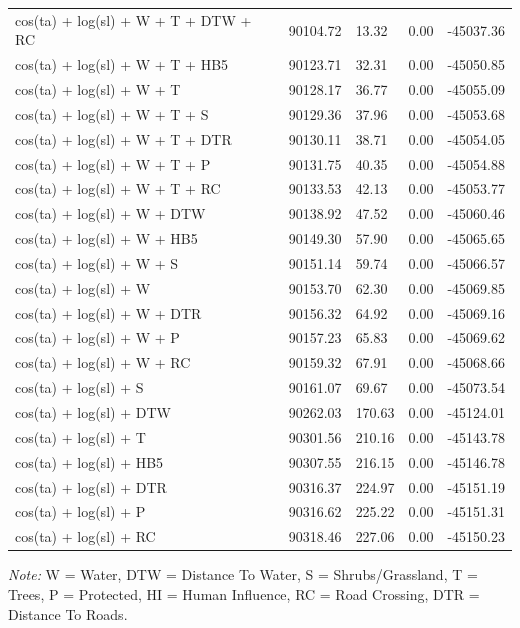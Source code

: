 \documentclass[abstract=off,10pt,a4paper,bibliography=totocnumbered]{article}
\begin{document}
\begin{table}[hbpt]
\begin{center}
{\begin{threeparttable}
\begin{tabular}{lllll}
          cos(ta) + log(sl) + W + T + DTW + RC & 90104.72 & 13.32 & 0.00 & -45037.36 \\
          cos(ta) + log(sl) + W + T + HB5 & 90123.71 & 32.31 & 0.00 & -45050.85 \\
          cos(ta) + log(sl) + W + T & 90128.17 & 36.77 & 0.00 & -45055.09 \\
          cos(ta) + log(sl) + W + T + S & 90129.36 & 37.96 & 0.00 & -45053.68 \\
          cos(ta) + log(sl) + W + T + DTR & 90130.11 & 38.71 & 0.00 & -45054.05 \\
          cos(ta) + log(sl) + W + T + P & 90131.75 & 40.35 & 0.00 & -45054.88 \\
          cos(ta) + log(sl) + W + T + RC & 90133.53 & 42.13 & 0.00 & -45053.77 \\
          cos(ta) + log(sl) + W + DTW & 90138.92 & 47.52 & 0.00 & -45060.46 \\
          cos(ta) + log(sl) + W + HB5 & 90149.30 & 57.90 & 0.00 & -45065.65 \\
          cos(ta) + log(sl) + W + S & 90151.14 & 59.74 & 0.00 & -45066.57 \\
          cos(ta) + log(sl) + W & 90153.70 & 62.30 & 0.00 & -45069.85 \\
          cos(ta) + log(sl) + W + DTR & 90156.32 & 64.92 & 0.00 & -45069.16 \\
          cos(ta) + log(sl) + W + P & 90157.23 & 65.83 & 0.00 & -45069.62 \\
          cos(ta) + log(sl) + W + RC & 90159.32 & 67.91 & 0.00 & -45068.66 \\
          cos(ta) + log(sl) + S & 90161.07 & 69.67 & 0.00 & -45073.54 \\
          cos(ta) + log(sl) + DTW & 90262.03 & 170.63 & 0.00 & -45124.01 \\
          cos(ta) + log(sl) + T & 90301.56 & 210.16 & 0.00 & -45143.78 \\
          cos(ta) + log(sl) + HB5 & 90307.55 & 216.15 & 0.00 & -45146.78 \\
          cos(ta) + log(sl) + DTR & 90316.37 & 224.97 & 0.00 & -45151.19 \\
          cos(ta) + log(sl) + P & 90316.62 & 225.22 & 0.00 & -45151.31 \\
          cos(ta) + log(sl) + RC & 90318.46 & 227.06 & 0.00 & -45150.23 \\
         \bottomrule
       \end{tabular}
       \begin{tablenotes}
         \item \textit{Note:} W = Water, DTW = Distance To Water, S =
         Shrubs/Grassland, T = Trees, P = Protected, HI = Human Influence, RC =
         Road Crossing, DTR = Distance To Roads.
       \end{tablenotes}
     \end{threeparttable}
    }
  \end{center}
\end{table}

\newpage
\begingroup
\singlespacing

\endgroup
\end{document}
